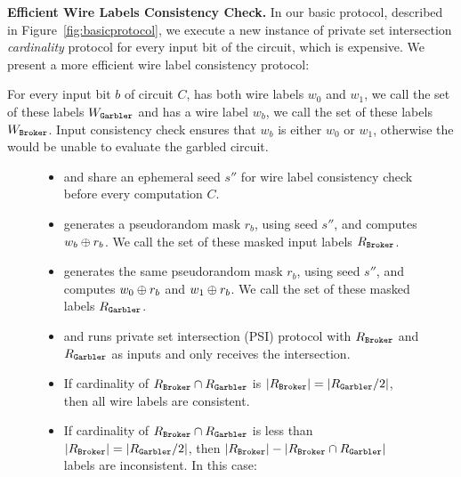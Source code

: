 \noindent\textbf{Efficient Wire Labels Consistency Check.} In our basic
protocol, described in Figure~\ref{fig:basicprotocol}, we execute a new
instance of private set intersection \emph{cardinality} protocol for every
input bit of the circuit, which is expensive.  We present a more efficient wire
label consistency protocol:

For every input bit $b$ of circuit $C$, \garbler has both wire labels $w_0$ and
$w_1$, we call the set of these labels $W_\texttt{Garbler}$ and \broker has a wire
label $w_b$, we call the set of these labels $W_\texttt{Broker}$. Input consistency
check ensures that $w_b$ is either $w_0$ or $w_1$, otherwise the \broker would
be unable to evaluate the garbled circuit.

\begin{figure}[h]
\begin{mdframed}[style=myframe]

\begin{itemize}[leftmargin=*,itemsep=4pt]

	\item \broker and \garbler share an ephemeral seed $s''$ for wire label
		consistency check before every computation $C$.

	\item \broker generates a pseudorandom mask $r_b$, using seed $s''$, and
		computes $w_b \oplus r_b$. We call the set of these masked input labels
		$R_\texttt{Broker}$. 

	\item \garbler generates the same pseudorandom mask $r_b$, using seed
		$s''$, and computes $w_0 \oplus r_b$ and $w_1 \oplus r_b$. We call the set of
		these masked labels $R_\texttt{Garbler}$.

	\item \broker and \garbler runs private set intersection (PSI) protocol with
		$R_\texttt{Broker}$ and $R_\texttt{Garbler}$ as inputs and only \broker receives the
		intersection.
		
	\item	If cardinality of $R_\texttt{Broker} \cap R_\texttt{Garbler}$ is $|R_\texttt{Broker}| =
		|R_\texttt{Garbler} / 2|$, then all wire labels are consistent. 

		\item If cardinality of $R_\texttt{Broker} \cap R_\texttt{Garbler}$ is less than
			$|R_\texttt{Broker}| = |R_\texttt{Garbler} / 2|$, then $|R_\texttt{Broker}| - |R_\texttt{Broker} \cap
			R_\texttt{Garbler}|$ labels are inconsistent. In this case:

			\begin{itemize}[leftmargin=*,itemsep=4pt,topsep=4pt]


\end{itemize}
\end{itemize}
\end{mdframed}
\end{figure}
